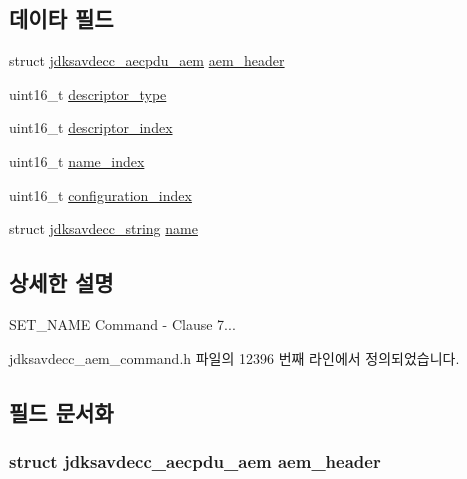 \subsection*{데이타 필드}
\begin{DoxyCompactItemize}
\item 
struct \hyperlink{structjdksavdecc__aecpdu__aem}{jdksavdecc\+\_\+aecpdu\+\_\+aem} \hyperlink{structjdksavdecc__aem__command__set__name_ae1e77ccb75ff5021ad923221eab38294}{aem\+\_\+header}
\item 
uint16\+\_\+t \hyperlink{structjdksavdecc__aem__command__set__name_ab7c32b6c7131c13d4ea3b7ee2f09b78d}{descriptor\+\_\+type}
\item 
uint16\+\_\+t \hyperlink{structjdksavdecc__aem__command__set__name_a042bbc76d835b82d27c1932431ee38d4}{descriptor\+\_\+index}
\item 
uint16\+\_\+t \hyperlink{structjdksavdecc__aem__command__set__name_a898a74ada625e0b227dadb02901404e6}{name\+\_\+index}
\item 
uint16\+\_\+t \hyperlink{structjdksavdecc__aem__command__set__name_afaad1bd7c66f9611e134d8c5ce98f444}{configuration\+\_\+index}
\item 
struct \hyperlink{structjdksavdecc__string}{jdksavdecc\+\_\+string} \hyperlink{structjdksavdecc__aem__command__set__name_a7e615b51b7768e9b59bfa450051e0f8e}{name}
\end{DoxyCompactItemize}


\subsection{상세한 설명}
S\+E\+T\+\_\+\+N\+A\+ME Command -\/ Clause 7... 

jdksavdecc\+\_\+aem\+\_\+command.\+h 파일의 12396 번째 라인에서 정의되었습니다.



\subsection{필드 문서화}
\subsubsection[{\texorpdfstring{aem\+\_\+header}{aem_header}}]{\setlength{\rightskip}{0pt plus 5cm}struct {\bf jdksavdecc\+\_\+aecpdu\+\_\+aem} aem\+\_\+header}\hypertarget{structjdksavdecc__aem__command__set__name_ae1e77ccb75ff5021ad923221eab38294}{}\label{structjdksavdecc__aem__command__set__name_ae1e77ccb75ff5021ad923221eab38294}


